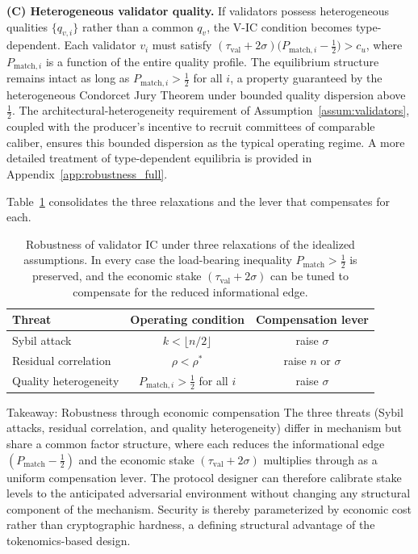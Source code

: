 \vspace{2mm}
\noindent\textbf{(C) Heterogeneous validator quality.}
If validators possess heterogeneous qualities $\{q_{v,i}\}$ rather than a common $q_v$, the V-IC condition becomes type-dependent. Each validator $v_i$ must satisfy $(\tau_{\text{val}}+2\sigma)\bigl(P_{\text{match},i} - \tfrac{1}{2}\bigr) > c_u$, where $P_{\text{match},i}$ is a function of the entire quality profile. The equilibrium structure remains intact as long as $P_{\text{match},i} > \tfrac{1}{2}$ for all $i$, a property guaranteed by the heterogeneous Condorcet Jury Theorem under bounded quality dispersion above $\tfrac{1}{2}$. The architectural-heterogeneity requirement of Assumption~\ref{assum:validators}, coupled with the producer's incentive to recruit committees of comparable caliber, ensures this bounded dispersion as the typical operating regime. A more detailed treatment of type-dependent equilibria is provided in Appendix~\ref{app:robustness_full}.

\vspace{2mm}
Table~\ref{tab:robustness} consolidates the three relaxations and the lever that compensates for each.

\begin{table}[!htbp]
\centering
\caption{Robustness of validator IC under three relaxations of the idealized assumptions. In every case the load-bearing inequality $P_{\text{match}} > \tfrac{1}{2}$ is preserved, and the economic stake $(\tau_{\text{val}}+2\sigma)$ can be tuned to compensate for the reduced informational edge.}
\vspace{2mm}
\setlength{\tabcolsep}{6pt}
\renewcommand{\arraystretch}{1.2}
\small
\begin{tabular}{lcc}
\toprule
\textbf{Threat} & \textbf{Operating condition} & \textbf{Compensation lever} \\
\midrule
Sybil attack & $k < \lfloor n/2 \rfloor$ & raise $\sigma$ \\
Residual correlation & $\rho < \rho^*$ & raise $n$ or $\sigma$ \\
Quality heterogeneity & $P_{\text{match},i} > \tfrac{1}{2}$ for all $i$ & raise $\sigma$ \\
\bottomrule
\end{tabular}
\label{tab:robustness}
\end{table}

\begin{interpretbox}{Takeaway: Robustness through economic compensation}
The three threats (Sybil attacks, residual correlation, and quality heterogeneity) differ in mechanism but share a common factor structure, where each reduces the informational edge $(P_{\text{match}} - \tfrac{1}{2})$ and the economic stake $(\tau_{\text{val}} + 2\sigma)$ multiplies through as a uniform compensation lever. The protocol designer can therefore calibrate stake levels to the anticipated adversarial environment without changing any structural component of the mechanism. Security is thereby parameterized by economic cost rather than cryptographic hardness, a defining structural advantage of the tokenomics-based design.
\end{interpretbox}

